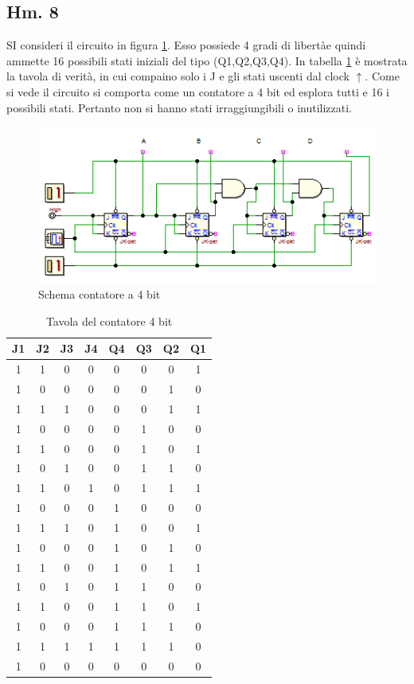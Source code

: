 \documentclass[journal, a4paper]{IEEEtran}
\begin{document}
\subsection{Hm. 8}

SI consideri il circuito in figura \ref{fig:count4}. Esso possiede 4 gradi di libertàe quindi ammette 16 possibili stati iniziali del tipo (Q1,Q2,Q3,Q4). In tabella \ref{tab:count4} è mostrata la tavola di verità, in cui compaino solo i J e gli stati uscenti dal clock $\uparrow$. Come si vede il circuito si comporta come un contatore a 4 bit ed esplora tutti e 16 i possibili stati. Pertanto non si hanno stati irraggiungibili o inutilizzati.

\begin{figure}[htp]
\centering
\includegraphics[scale=.8]{hm8}
\caption{Schema contatore a 4 bit}
\label{fig:count4}
\end{figure}

\begin{table}
\centering
\caption{Tavola del contatore 4 bit}
\label{tab:count4}
\begin{tabular}{|c|c|c|c|c|c|c|c|}
\hline 
J1 & J2 & J3 & J4 & Q4 & Q3 & Q2 & Q1 \\ 
\hline 
1 & 1 & 0 & 0 & 0 & 0 & 0 & 1 \\ 
\hline 
1 & 0 & 0 & 0 & 0 & 0 & 1 & 0 \\ 
\hline 
1 & 1 & 1 & 0 & 0 & 0 & 1 & 1 \\ 
\hline 
1 & 0 & 0 & 0 & 0 & 1 & 0 & 0 \\ 
\hline 
1 & 1 & 0 & 0 & 0 & 1 & 0 & 1 \\ 
\hline 
1 & 0 & 1 & 0 & 0 & 1 & 1 & 0 \\ 
\hline 
1 & 1 & 0 & 1 & 0 & 1 & 1 & 1 \\ 
\hline 
1 & 0 & 0 & 0 & 1 & 0 & 0 & 0 \\ 
\hline 
1 & 1 & 1 & 0 & 1 & 0 & 0 & 1 \\ 
\hline 
1 & 0 & 0 & 0 & 1 & 0 & 1 & 0 \\ 
\hline 
1 & 1 & 0 & 0 & 1 & 0 & 1 & 1 \\ 
\hline 
1 & 0 & 1 & 0 & 1 & 1 & 0 & 0 \\ 
\hline 
1 & 1 & 0 & 0 & 1 & 1 & 0 & 1 \\ 
\hline 
1 & 0 & 0 & 0 & 1 & 1 & 1 & 0 \\ 
\hline 
1 & 1 & 1 & 1 & 1 & 1 & 1 & 0 \\ 
\hline 
1 & 0 & 0 & 0 & 0 & 0 & 0 & 0 \\ 
\hline 
\end{tabular}
\end{table}
\end{document}
